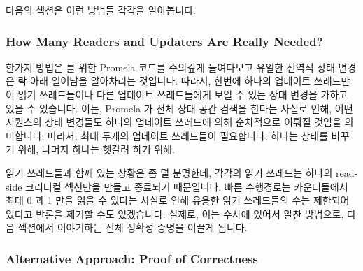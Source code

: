 다음의 섹션은 이런 방법들 각각을 알아봅니다.
\iffalse

The following sections discuss each of these approaches.
\fi

\subsubsection{How Many Readers and Updaters Are Really Needed?}
\label{sec:formal:How Many Readers and Updaters Are Really Needed?}

한가지 방법은  를 위한 Promela 코드를 주의깊게 들여다보고
유일한 전역적 상태 변경은 락 아래 일어남을 알아차리는 것입니다.
따라서, 한번에 하나의 업데이트 쓰레드만이 읽기 쓰레드들이나 다른 업데이트
쓰레드들에게 보일 수 있는 상태 변경을 가하고 있을 수 있습니다.
이는, Promela 가 전체 상태 공간 검색을 한다는 사실로 인해, 어떤 시퀀스의 상태
변경들도 하나의 업데이트 쓰레드에 의해 순차적으로 이뤄질 것임을 의미합니다.
따라서, 최대 두개의 업데이트 쓰레드들이 필요합니다: 하나는 상태를 바꾸기 위해,
나머지 하나는 헷갈려 하기 위해.

읽기 쓰레드들과 함께 있는 상황은 좀 덜 분명한데, 각각의 읽기 쓰레드는 하나의
read-side 크리티컬 섹션만을 만들고 종료되기 때문입니다.
빠른 수행경로는 카운터들에서 최대 0 과 1 만을 읽을 수 있다는 사실로 인해 유용한
읽기 쓰레드들의 수는 제한되어 있다고 반론을 제기할 수도 있겠습니다.
실제로, 이는 수사에 있어서 알찬 방법으로, 다음 섹션에서 이야기하는 전체 정확성
증명을 이끌게 됩니다.
\iffalse

One approach is to look carefully at the Promela code for
\co{qrcu_updater()} and notice that the only global state
change is happening under the lock.
Therefore, only one updater at a time can possibly be modifying
state visible to either readers or other updaters.
This means that any sequences of state changes can be carried
out serially by a single updater due to the fact that Promela does a full
state-space search.
Therefore, at most two updaters are required: one to change state
and a second to become confused.

The situation with the readers is less clear-cut, as each reader
does only a single read-side critical section then terminates.
It is possible to argue that the useful number of readers is limited,
due to the fact that the fastpath must see at most a zero and a one
in the counters.
This is a fruitful avenue of investigation, in fact, it leads to
the full proof of correctness described in the next section.
\fi

\subsubsection{Alternative Approach: Proof of Correctness}
\label{sec:formal:Alternative Approach: Proof of Correctness}

